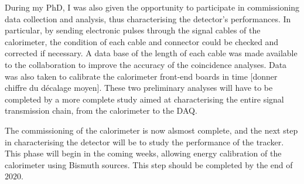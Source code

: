 During my PhD, I was also given the opportunity to participate in commissioning data collection and analysis, thus characterising the detector's performances.
In particular, by sending electronic pulses through the signal cables of the calorimeter, the condition of each cable and connector could be checked and corrected if necessary.
A data base of the length of each cable was made available to the collaboration to improve the accuracy of the coincidence analyses.
Data was also taken to calibrate the calorimeter front-end boards in time [donner chiffre du décalage moyen].
These two preliminary analyses will have to be completed by a more complete study aimed at characterising the entire signal transmission chain, from the calorimeter to the DAQ.

The commissioning of the calorimeter is now alsmost complete, and the next step in characterising the detector will be to study the performance of the tracker.
This phase will begin in the coming weeks, allowing energy calibration of the calorimeter using Bismuth sources.
This step should be completed by the end of $2020$.
